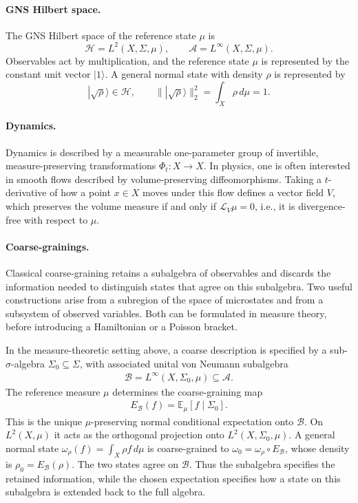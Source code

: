 \documentclass[a4paper,11pt]{article}
\theoremstyle{definition}
\theoremstyle{remark}
\newcommand{\mA}{\mathcal{A}}
\newcommand{\mB}{\mathcal{B}}
\newcommand{\mH}{\mathcal{H}}
\begin{document}
\paragraph{GNS Hilbert space.}
The GNS Hilbert space of the reference state $\mu$ is
\[
  \mH=L^2(X,\Sigma,\mu), \qquad \mA=L^\infty(X,\Sigma,\mu).
\]
Observables act by multiplication, and the reference state $\mu$ is represented by the
constant unit vector $|1\rangle$.  A general normal state with density $\rho$ is
represented by
\[
  |\sqrt{\rho}\rangle\in\mH, \qquad
  \||\sqrt{\rho}\rangle\|_2^2=\int_X\rho\,d\mu=1.
\]
 
\paragraph{Dynamics.}
Dynamics is described by a measurable one-parameter group of invertible,
measure-preserving transformations $\Phi_t:X\to X$.  In physics, one is often
interested in smooth flows described by volume-preserving diffeomorphisms.  Taking a
$t$-derivative of how a point $x\in X$ moves under this flow defines a vector field
$V$, which preserves the volume measure if and only if $\mathcal{L}_V\mu=0$, i.e., it
is divergence-free with respect to $\mu$.
 
\paragraph{Coarse-grainings.}
Classical coarse-graining retains a subalgebra of observables and discards the
information needed to distinguish states that agree on this subalgebra.  Two useful
constructions arise from a subregion of the space of microstates and from a subsystem
of observed variables.  Both can be formulated in measure theory, before introducing a
Hamiltonian or a Poisson bracket.
 
In the measure-theoretic setting above, a coarse description is specified by a
sub-$\sigma$-algebra $\Sigma_0\subseteq\Sigma$, with associated unital von Neumann
subalgebra
\begin{align}
    \mB=L^\infty(X,\Sigma_0,\mu)\subseteq\mA.
\end{align}
The reference measure $\mu$ determines the coarse-graining map
\begin{align}
    E_{\mB}(f)=\mathbb{E}_\mu[f\mid\Sigma_0].
\end{align}
This is the unique $\mu$-preserving normal conditional expectation onto $\mB$.  On
$L^2(X,\mu)$ it acts as the orthogonal projection onto $L^2(X,\Sigma_0,\mu)$.  A
general normal state $\omega_\rho(f)=\int_X\rho f\,d\mu$ is coarse-grained to
$\omega_0=\omega_\rho\circ E_{\mB}$, whose density is $\rho_0=E_{\mB}(\rho)$.  The
two states agree on $\mB$.  Thus the subalgebra specifies the retained information,
while the chosen expectation specifies how a state on this subalgebra is extended back
to the full algebra.
 
\end{document}
